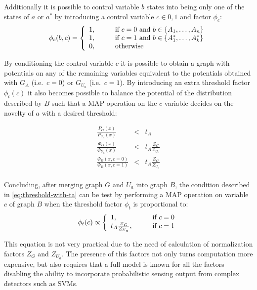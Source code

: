 Additionally it is possible to control variable $b$ states into being only one
of the states of $a$ or $a^*$ by introducing a control variable $c \in {0, 1}$
and factor $\phi_{c}$:
\[
\phi_{c}(b, c) = \left\{
  \begin{array}{l l}
    1, & \qquad \text{if } c = 0 \text{ and } b \in \{A_1,\dotsc,A_n\} \\
    1, & \qquad \text{if } c = 1 \text{ and } b \in \{A^*_1,\dotsc,A^*_k\}\\
    0, & \qquad \text{otherwise}
  \end{array} \right.
\]

By conditioning the control variable $c$ it is possible to obtain a graph with
potentials on any of the remaining variables equivalent to the potentials
obtained with $G_A$ (i.e.\ $c=0$) or $G_{U_a}$ (i.e.\ $c=1$). By introducing
an extra threshold factor $\phi_t(c)$ it also becomes possible to balance the
potential of the distribution described by $B$ such that a \gls{MAP} operation
on the $c$ variable decides on the novelty of $a$ with a desired threshold:

\begin{eqnarray*}
 \frac{P_G(x)}{P_{U_a}(x)}&<& t_A \\
 \frac{\Phi_G(x)}{\Phi_{U_a}(x)}    &<& t_A \frac{Z_G}{Z_{U_a}} \\
 \frac{\Phi_B(x, c=0)}{\Phi_{B}(x, c=1)}    &<& t_A \frac{Z_G}{Z_{U_a}} \\
\end{eqnarray*}

Concluding, after merging graph $G$ and $U_a$ into graph $B$, the condition
described in \autoref{eq:threshold-with-ta} can be test by performing a
\gls{MAP} operation on variable $c$ of graph $B$ when the threshold factor
$\phi_t$ is proportional to:
\begin{equation}
\label{eq:structure-ratio}
\phi_t(c) \propto \left\{
  \begin{array}{l l}
    1, & \qquad \text{if } c = 0 \\
    t_A \frac{Z_G}{Z_{U_a}}, & \qquad \text{if } c = 1\\
  \end{array} \right.
\end{equation}

This equation is not very practical due to the need of calculation of
normalization factors $Z_G$ and $Z_{U_a}$. The presence of this factors
not only turns computation more expensive, but also requires that a full model
is known for all the factors disabling the ability to incorporate probabilistic
sensing output from complex detectors such as \glspl{SVM}.
 
